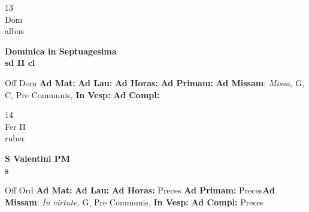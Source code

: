 \documentclass[10pt, openany]{book}
\begin{document}
    \begin{center}
        \begin{minipage}{3.5in}
            \vspace{2em}
            \begin{minipage}{0.5in}
                {\Huge 13} \\
                {\normalsize Dom} \\
                {\normalsize albus}
            \end{minipage}
            \begin{minipage}{3.0in}
                \textbf{ \large Dominica in Septuagesima \\
                \textnormal{\normalsize sd II cl}} \\ 
            \end{minipage}
            \begin{justify}Off Dom
                \textbf{Ad Mat: }
                \textbf{Ad Lau: }
                \textbf{Ad Horas: }
                \textbf{Ad Primam: }\textbf{Ad Missam}: \textit{Missa,} G, C, Pre Communis,  
                \textbf{In Vesp: }
                \textbf{Ad Compl: }
            \end{justify}
        \end{minipage}
    \end{center}

    \begin{center}
        \begin{minipage}{3.5in}
            \vspace{2em}
            \begin{minipage}{0.5in}
                {\Huge 14} \\
                {\normalsize Fer II} \\
                {\normalsize ruber}
            \end{minipage}
            \begin{minipage}{3.0in}
                \textbf{ \large S Valentini PM \\
                \textnormal{\normalsize s}} \\ 
            \end{minipage}
            \begin{justify}Off Ord
                \textbf{Ad Mat: }
                \textbf{Ad Lau: }
                \textbf{Ad Horas: }Preces
                \textbf{Ad Primam: }Preces\textbf{Ad Missam}: \textit{In virtute,} G, Pre Communis,  
                \textbf{In Vesp: }
                \textbf{Ad Compl: }Preces
            \end{justify}
        \end{minipage}
    \end{center}
\end{document}
